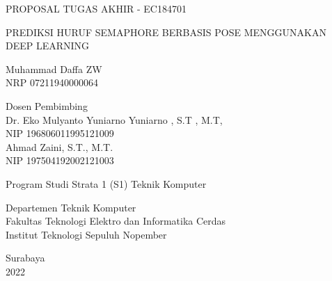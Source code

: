 \begin{large}
  PROPOSAL TUGAS AKHIR - EC184701
\end{large}

\vspace{\fill}

\begin{spacing}{1.5}
  \begin{Large}
    PREDIKSI HURUF SEMAPHORE BERBASIS POSE MENGGUNAKAN DEEP LEARNING%
  \end{Large}
\end{spacing}

\vspace{\fill}

\begin{large}
  Muhammad Daffa ZW \\
  \textnormal{NRP 07211940000064}
\end{large}

\vspace{\fill}

\begin{large}
  \textnormal{Dosen Pembimbing} \\
  Dr. Eko Mulyanto Yuniarno Yuniarno , S.T , M.T, \\
  \textnormal{NIP 196806011995121009} \\
  Ahmad Zaini, S.T., M.T. \\
  \textnormal{NIP 197504192002121003}
\end{large}

\vspace{\fill}

Program Studi Strata 1 (S1) Teknik Komputer \\

\normalfont

Departemen Teknik Komputer \\
Fakultas Teknologi Elektro dan Informatika Cerdas \\
Institut Teknologi Sepuluh Nopember

Surabaya \\
2022
